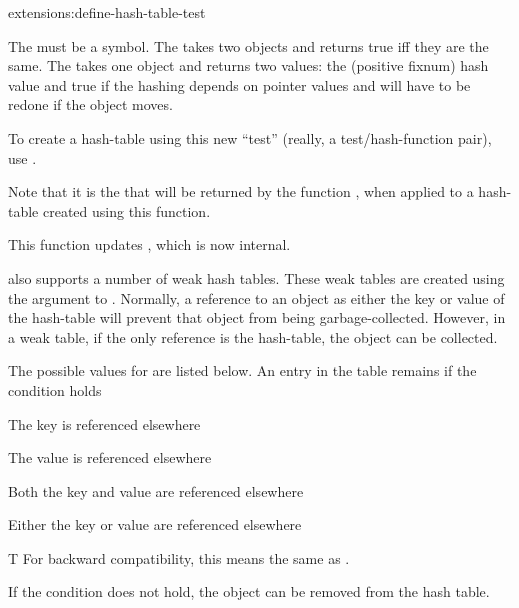 \begin{defun}{extensions:}{define-hash-table-test}%
  {}
      
      The  must be a symbol.
      The  takes two objects and returns true
      iff they are the same.  The  takes one object and
      returns two values: the (positive fixnum) hash value and true if
      the hashing depends on pointer values and will have to be redone
      if the object moves.
      
      To create a hash-table using this new ``test'' (really, a
      test/hash-function pair), use
      .

      Note that it is the  that will be
      returned by the function , when applied to
      a hash-table created using this function.

      This function updates , which is now
      internal.  
\end{defun}

\cmucl{} also supports a number of weak hash tables.  These weak
tables are created using the  argument to
.  Normally, a reference to an object as either
the key or value of the hash-table will prevent that object from being
garbage-collected.  However, in a weak table, if the only reference is
the hash-table, the object can be collected.

The possible values for  are listed below.  An entry in
the table remains if the condition holds
\begin{Lentry}
\item[\kwd{key}] The key is referenced elsewhere
\item[\kwd{value}] The value is referenced elsewhere
\item[\kwd{key-and-value}] Both the key and value are referenced elsewhere
\item[\kwd{key-or-value}] Either the key or value are referenced elsewhere
\item[T] For backward compatibility, this means the same as .
\end{Lentry}
If the condition does not hold, the object can be removed from the
hash table.  

